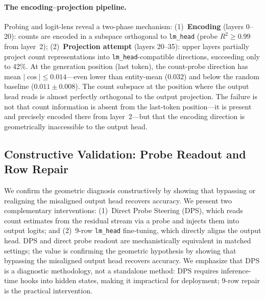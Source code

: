 \documentclass{article}
\begin{document}
\paragraph{The encoding--projection pipeline.}
Probing and logit-lens reveal a two-phase mechanism:
(1)~\textbf{Encoding} (layers 0--20): counts are encoded in a subspace orthogonal to \texttt{lm\_head} (probe $R^2 \geq 0.99$ from layer~2);
(2)~\textbf{Projection attempt} (layers 20--35): upper layers partially project count representations into \texttt{lm\_head}-compatible directions, succeeding only to 42\%.
At the generation position (last token), the count-probe direction has mean $|\cos| \leq 0.014$---even lower than entity-mean ($0.032$) and below the random baseline ($0.011 \pm 0.008$).
The count subspace at the position where the output head reads is almost
perfectly orthogonal to the output projection.
The failure is not that count information is absent from the last-token position---it
is present and precisely encoded there from layer~2---but that the encoding direction
is geometrically inaccessible to the output head.

\subsection{Constructive Validation: Probe Readout and Row Repair}
\label{sec:dps}

We confirm the geometric diagnosis constructively by showing that bypassing or realigning the misaligned output head recovers accuracy.
We present two complementary interventions:
(1)~Direct Probe Steering (DPS), which reads count estimates from the residual stream via a probe and injects them into output logits;
and (2)~9-row \texttt{lm\_head} fine-tuning, which directly aligns the output head.
DPS and direct probe readout are mechanistically equivalent in matched settings;
the value is confirming the geometric hypothesis by showing that bypassing the
misaligned output head recovers accuracy.
We emphasize that DPS is a diagnostic methodology, not a standalone method:
DPS requires inference-time hooks into hidden states, making it impractical for
deployment; 9-row repair is the practical intervention.
\end{document}
